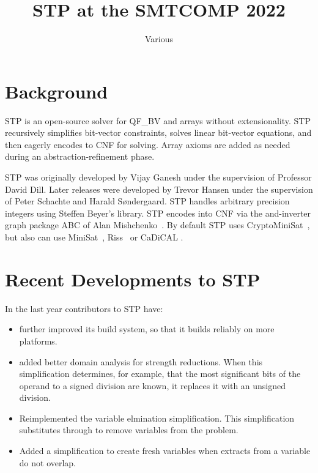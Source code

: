 \documentclass{easychair}
\begin{document}
\title{STP at the SMTCOMP 2022}
\author{Various}
\institute{}

\maketitle
\thispagestyle{empty}
\pagestyle{empty}

\section{Background}
STP\cite{Vijay:Thesis:2007, Trevor:Thesis:2012} is an open-source solver for QF\_BV and arrays without extensionality. 
STP recursively simplifies bit-vector constraints, solves linear bit-vector equations, and then eagerly encodes to CNF for solving. 
Array axioms are added as needed during an abstraction-refinement phase.

STP was originally developed by Vijay Ganesh under the supervision of Professor David Dill. 
Later releases were developed by Trevor Hansen under the supervision of Peter Schachte and Harald Søndergaard. 
STP handles arbitrary precision integers using Steffen Beyer's library. 
STP encodes into CNF via the and-inverter graph package ABC of Alan Mishchenko~\cite{Brayton:2010:AAI:2144310.2144317}.
By default STP uses CryptoMiniSat~\cite{CMS:github}, but also can use MiniSat~\cite{MiniSat:github}, Riss~\cite{Riss:github} or CaDiCAL \cite{cadical}.

\section{Recent Developments to STP}
In the last year contributors to STP have:
\begin{itemize}
\item {further improved its build system, so that it builds reliably on more platforms.}
\item {added better domain analysis for strength reductions. When this simplification determines, for example, that the most significant bits of the operand to a signed division are known, it replaces it with an unsigned division.}
\item {Reimplemented the variable elmination simplification. This simplification substitutes through to remove variables from the problem. }
\item {Added a simplification to create fresh variables when extracts from a variable do not overlap.}
\end{itemize}
\end{document}
